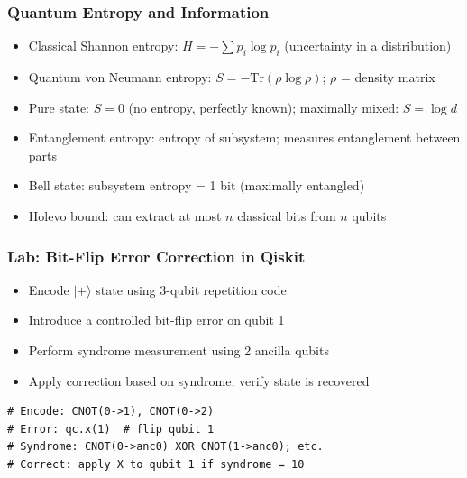 \begin{frame}[fragile]\frametitle{Quantum Entropy and Information}
\begin{itemize}
\item Classical Shannon entropy: $H = -\sum p_i \log p_i$ (uncertainty in a distribution)
\item Quantum von Neumann entropy: $S = -\text{Tr}(\rho \log \rho)$; $\rho$ = density matrix
\item Pure state: $S = 0$ (no entropy, perfectly known); maximally mixed: $S = \log d$
\item Entanglement entropy: entropy of subsystem; measures entanglement between parts
\item Bell state: subsystem entropy = 1 bit (maximally entangled)
\item Holevo bound: can extract at most $n$ classical bits from $n$ qubits
\end{itemize}
\end{frame}

\begin{frame}[fragile]\frametitle{Lab: Bit-Flip Error Correction in Qiskit}
\begin{itemize}
\item Encode $|+\rangle$ state using 3-qubit repetition code
\item Introduce a controlled bit-flip error on qubit 1
\item Perform syndrome measurement using 2 ancilla qubits
\item Apply correction based on syndrome; verify state is recovered
\end{itemize}
\begin{verbatim}
# Encode: CNOT(0->1), CNOT(0->2)
# Error: qc.x(1)  # flip qubit 1
# Syndrome: CNOT(0->anc0) XOR CNOT(1->anc0); etc.
# Correct: apply X to qubit 1 if syndrome = 10
\end{verbatim}
\end{frame}

